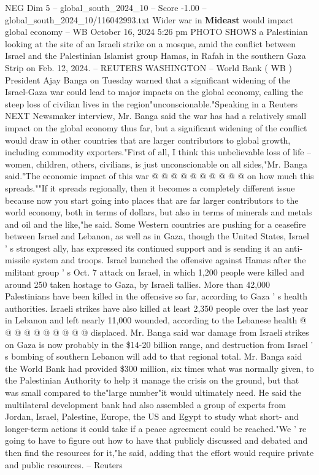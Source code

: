 \begin{textsample}{NEG Dim 5 – global\_south\_2024\_10 – Score -1.00 – global\_south\_2024\_10/116042993.txt}  \label{ex:f5_neg_138}
Wider war in \textbf{Mideast} would impact global economy -- WB October 16, 2024 5:26 pm PHOTO SHOWS a Palestinian looking at the site of an Israeli strike on a mosque, amid the conflict between Israel and the Palestinian Islamist group Hamas, in Rafah in the southern Gaza Strip on Feb. 12, 2024. -- REUTERS WASHINGTON -- World Bank ( WB ) President Ajay Banga on Tuesday warned that a significant widening of the Israel-Gaza war could lead to major impacts on the global economy, calling the steep loss of civilian lives in the region"unconscionable."Speaking in a Reuters NEXT Newsmaker interview, Mr.
Banga said the war has had a relatively small impact on the global economy thus far, but a significant widening of the conflict would draw in other countries that are larger contributors to global growth, including commodity exporters."First of all, I think this unbelievable loss of life -- women, children, others, civilians, is just unconscionable on all sides,"Mr.
Banga said."The economic impact of this war @ @ @ @ @ @ @ @ @ @ on how much this spreads.""If it spreads regionally, then it becomes a completely different issue because now you start going into places that are far larger contributors to the world economy, both in terms of dollars, but also in terms of minerals and metals and oil and the like,"he said.
Some Western countries are pushing for a ceasefire between Israel and Lebanon, as well as in Gaza, though the United States, Israel ' s strongest ally, has expressed its continued support and is sending it an anti-missile system and troops.
Israel launched the offensive against Hamas after the militant group ' s Oct. 7 attack on Israel, in which 1,200 people were killed and around 250 taken hostage to Gaza, by Israeli tallies.
More than 42,000 Palestinians have been killed in the offensive so far, according to Gaza ' s health authorities.
Israeli strikes have also killed at least 2,350 people over the last year in Lebanon and left nearly 11,000 wounded, according to the Lebanese health @ @ @ @ @ @ @ @ @ @ displaced.
Mr.
Banga said war damage from Israeli strikes on Gaza is now probably in the \$14-20 billion range, and destruction from Israel ' s bombing of southern Lebanon will add to that regional total.
Mr.
Banga said the World Bank had provided \$300 million, six times what was normally given, to the Palestinian Authority to help it manage the crisis on the ground, but that was small compared to the"large number"it would ultimately need.
He said the multilateral development bank had also assembled a group of experts from Jordan, Israel, Palestine, Europe, the US and Egypt to study what short- and longer-term actions it could take if a peace agreement could be reached."We ' re going to have to figure out how to have that publicly discussed and debated and then find the resources for it,"he said, adding that the effort would require private and public resources. -- Reuters

\end{textsample}
